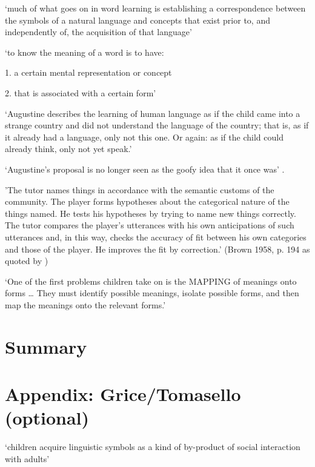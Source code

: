 \documentclass[12pt]{extarticle}
\begin{document}
\begin{multicols}{3}
‘much of what goes on in word learning is establishing a correspondence between the symbols of a natural language and concepts that exist prior to, and independently of, the acquisition of that language’
 
\citep[p.\ 242]{Bloom:2000qz}
 
‘to know the meaning of a word is to have:

1. a certain mental representation or concept

2.	that is associated with a certain form’

\citep[p.\ 17]{Bloom:2000qz}
 
‘Augustine describes the learning of human language as if the child came into a strange country and did not understand the language of the country; that is, as if it already had a language, only not this one. Or again: as if the child could already think, only not yet speak.’
\citep[15--16, §32]{Wittgenstein:1953mm}
 
‘Augustine’s proposal is no longer seen as the goofy idea that it once was’ \citep[p.\ 61]{Bloom:2000qz}.
 
'The tutor names things in accordance with the semantic customs of the community. The player forms hypotheses about the categorical nature of the things named. He tests his hypotheses by trying to name new things correctly. The tutor compares the player's utterances with his own anticipations of such utterances and, in this way, checks the accuracy of fit between his own categories and those of the player. He improves the fit by correction.'
(Brown 1958, p. 194 as quoted by \citep[p.\ 19]{Clark:1993bv})
 
‘One of the first problems children take on is the MAPPING of meanings onto forms … They must identify possible meanings, isolate possible forms, and then map the meanings onto the relevant forms.’
\citep[p.\ 14]{Clark:1993bv}
 
 
 
\section{Summary}
 
 
 
\section{Appendix: Grice/Tomasello (optional)}
 
‘children acquire linguistic symbols as a kind of by-product of social interaction with adults’
\citep[p.\ 90]{Tomasello:2003fk}
 

\end{multicols}
\end{document}
